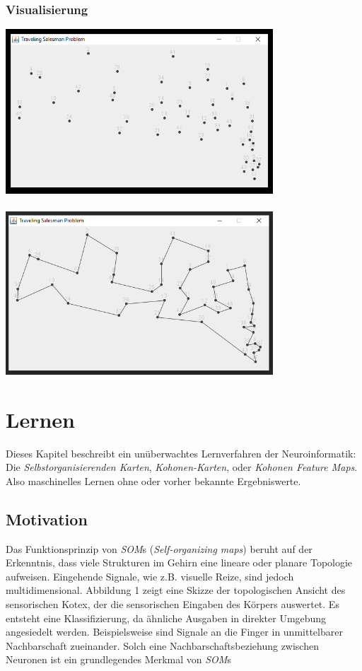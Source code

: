\documentclass[11pt]{article}
\begin{document}
    \subsubsection{Visualisierung}

    \begin{center}
        \includegraphics[width=10cm]{../../resources/tsp_cities.png}
        \\~\\
        \includegraphics[width=10cm]{../../resources/tsp_cities_connected.png}
    \end{center}

    \newpage

    \section{Lernen}

    Dieses Kapitel beschreibt ein unüberwachtes Lernverfahren der Neuroinformatik: Die
    \textit{Selbstorganisierenden Karten}, \textit{Kohonen-Karten}, oder \textit{Kohonen Feature
    Maps}. Also maschinelles Lernen ohne oder vorher bekannte Ergebniswerte.

    \subsection{Motivation}
    Das Funktionsprinzip von \textit{SOM}s (\textit{Self-organizing maps}) beruht auf der
    Erkenntnis, dass viele Strukturen im Gehirn eine lineare oder planare Topologie aufweisen.
    Eingehende Signale, wie z.B. visuelle Reize, sind jedoch multidimensional. Abbildung 1 zeigt
    eine Skizze der topologischen Ansicht des sensorischen Kotex, der die sensorischen Eingaben
    des Körpers auswertet. Es entsteht eine Klassifizierung, da ähnliche Ausgaben in direkter
    Umgebung angesiedelt werden. Beispielsweise sind Signale an die Finger in unmittelbarer
    Nachbarschaft zueinander. Solch eine Nachbarschaftsbeziehung zwischen Neuronen ist ein
    grundlegendes Merkmal von \textit{SOM}s
\end{document}
